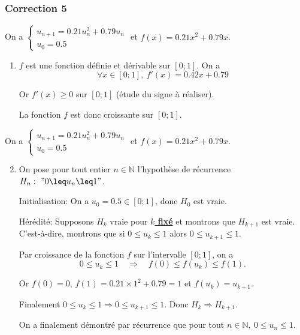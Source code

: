 \documentclass[15pt, mathserif]{beamer}
\begin{document}
\begin{frame}
\vspace{-10mm}
	\frametitle{Correction 5}
On a $\begin{cases} u_{n+1} = 0.21u_n^2+0.79u_n\\[1em] u_0 = 0.5\end{cases}$ et $f(x) = 0.21x^2+0.79x$.

\begin{enumerate}
	\item $f$ est une fonction définie et dérivable sur $[0;1]$. On a \[\forall x \in [0;1], ~ f'(x) = 0.42x+0.79\]

 Or $f'(x) \geq 0$ sur $[0;1]$ (étude du signe à réaliser). 

La fonction $f$ est donc croissante sur $[0;1]$.

\end{enumerate}
\end{frame}


\begin{frame}On a $\begin{cases} u_{n+1} = 0.21u_n^2+0.79u_n\\[1em] u_0 = 0.5\end{cases}$ et $f(x) = 0.21x^2+0.79x$.

\begin{enumerate}\setcounter{enumi}{1}

	\item On pose pour tout entier $n \in \mathbb{N}$ l'hypothèse de récurrence $H_n:~"0 \leq u_n \leq 1"$.

\medskip

Initialisation: On a $u_0 =0.5 \in [0;1]$, donc $H_0$ est vraie.

\medskip

Hérédité: Supposons $H_k$ vraie pour \textbf\underline{{$k$ fixé}} et montrons que $H_{k+1}$ est vraie. C'est-à-dire, montrons que si $0 \leq u_k \leq 1$ alors $0 \leq u_{k+1} \leq 1$.

 Par croissance de la fonction $f$ sur l'intervalle $[0;1]$, on a \[0\leq u_k \leq 1 \quad \Rightarrow \quad f(0) \leq f(u_k) \leq f(1).\]

 Or $f(0) = 0$, $f(1) = 0.21\times 1^2+0.79= 1$ et $f(u_k) = u_{k+1}$.

 Finalement $0\leq u_k \leq 1 \Rightarrow 0 \leq u_{k+1} \leq 1$. Donc $H_{k} \Rightarrow H_{k+1}$.

 On a finalement démontré par récurrence que pour tout $n \in\mathbb{N},~ 0 \leq u_n \leq 1$.

\end{enumerate}
\end{frame}
\end{document}
